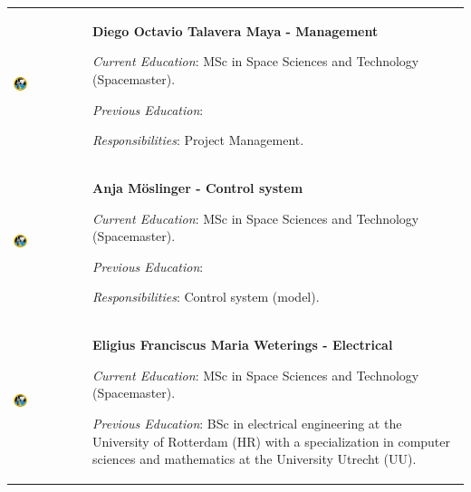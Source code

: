 
\begin{longtable}[]{m{} m{}}

\includegraphics[width=0.2\textwidth]{0-cover/img/logo-rexus-bexus.png} & \textbf{Diego Octavio Talavera Maya - Management}

\smallskip
\textit{Current Education}: MSc in Space Sciences and Technology (Spacemaster).

\smallskip
\textit{Previous Education}:

\smallskip
\textit{Responsibilities}: Project Management.
\bigskip
\\

 \includegraphics[width=0.2\textwidth]{0-cover/img/logo-rexus-bexus.png}  & \textbf{Anja M\"oslinger - Control system}

\smallskip
\textit{Current Education}: MSc in Space Sciences and Technology (Spacemaster).

\smallskip
\textit{Previous Education}:

\smallskip
\textit{Responsibilities}: Control system (model).
\bigskip
\\

 \includegraphics[width=0.2\textwidth]{0-cover/img/logo-rexus-bexus.png}  & \textbf{Eligius Franciscus Maria Weterings - Electrical}

\smallskip
\textit{Current Education}: MSc in Space Sciences and Technology (Spacemaster).

\smallskip
\textit{Previous Education}: BSc in electrical engineering at the University of Rotterdam (HR) with a specialization in computer sciences and mathematics at the University Utrecht (UU). 


\end{longtable}
